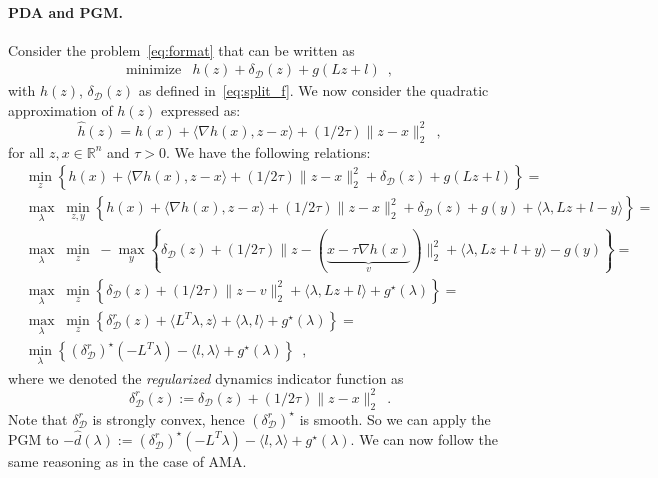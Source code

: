\documentclass[openany]{now}
\newcommand{\reals}{{\mathbb R}}
\begin{document}
\paragraph{PDA and PGM.} 
Consider the problem~\eqref{eq:format} that can be written as
\begin{equation*}
     \begin{array}{ll}
      \mbox{minimize} & h(z)+\delta_\mathcal{D}(z)+g(Lz+l)\enspace,
    \end{array}
\end{equation*}
with $h(z)$, $\delta_\mathcal{D}(z)$ as defined in~\eqref{eq:split_f}. 
We now consider the quadratic approximation of $h(z)$ expressed as:
\[
 \hat{h}(z) = h(x) + \langle\nabla h(x),z-x\rangle + (1/2\tau)\|z-x\|_2^2\enspace, 
\]
for all $z,x\in\reals^n$ and $\tau>0$.
We have the following relations:
\begin{align*}
 &\underset{z}{\min} \left\{ h(x) + \langle\nabla h(x),z-x\rangle + (1/2\tau)\|z-x\|_2^2+\delta_\mathcal{D}(z)+g(Lz+l)\right\} = \\
 &\underset{\lambda}{\max}\;\underset{z,y}{\min} \left\{ h(x) + \langle\nabla h(x),z-x\rangle + (1/2\tau)\|z-x\|_2^2+\delta_\mathcal{D}(z)+g(y)+\langle\lambda,Lz+l-y\rangle\right\}=\\
 &\underset{\lambda}{\max}\;\underset{z}{\min}\;-\underset{y}{\max} \left\{\delta_\mathcal{D}(z)+(1/2\tau)\|z-(\underbrace{x-\tau\nabla h(x)}_{v})\|_2^2+\langle\lambda,Lz+l+y\rangle-g(y)\right\}=\\
 &\underset{\lambda}{\max}\;\underset{z}{\min} \left\{\delta_\mathcal{D}(z)+(1/2\tau)\|z-v\|_2^2+\langle\lambda,Lz+l\rangle+g^\star(\lambda)\right\}=\\
 &\underset{\lambda}{\max}\;\underset{z}{\min} \left\{\delta_\mathcal{D}^r(z)+\langle L^T\lambda,z\rangle+\langle \lambda,l\rangle+g^\star(\lambda)\right\}=\\
 &\underset{\lambda}{\min} \left\{\left(\delta_\mathcal{D}^r\right)^\star(-L^T\lambda)-\langle l,\lambda\rangle+g^\star(\lambda)\right\}\enspace,
\end{align*}
where we denoted the \emph{regularized} dynamics indicator function as
\[
 \delta_\mathcal{D}^r(z) := \delta_\mathcal{D}(z) + (1/2\tau)\|z-x\|_2^2\enspace.
\]
Note that $\delta_\mathcal{D}^r$ is strongly convex, hence $\left(\delta_\mathcal{D}^r\right)^\star$ is smooth. So we can apply the PGM to $-\hat{d}(\lambda):=\left(\delta_\mathcal{D}^r\right)^\star(-L^T\lambda)-\langle l,\lambda\rangle+g^\star(\lambda)$. We can now follow the same reasoning as in the case of AMA.
\end{document}
